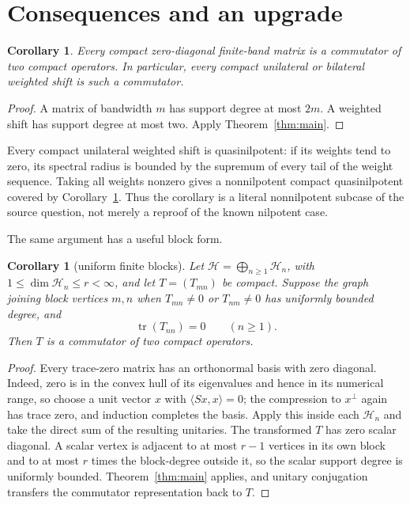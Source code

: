 \documentclass[11pt]{article}
\newtheorem{corollary}[theorem]{Corollary}
\newcommand{\Hc}{\mathcal H}
\begin{document}
\section*{Consequences and an upgrade}

\begin{corollary}\label{cor:band}
Every compact zero-diagonal finite-band matrix is a commutator of two compact
operators.  In particular, every compact unilateral or bilateral weighted
shift is such a commutator.
\end{corollary}

\begin{proof}
A matrix of bandwidth $m$ has support degree at most $2m$.  A weighted shift
has support degree at most two.  Apply Theorem~\ref{thm:main}.
\end{proof}

Every compact unilateral weighted shift is quasinilpotent: if its weights
tend to zero, its spectral radius is bounded by the supremum of every tail of
the weight sequence.  Taking all weights nonzero gives a nonnilpotent compact
quasinilpotent covered by Corollary~\ref{cor:band}.  Thus the corollary is a
literal nonnilpotent subcase of the source question, not merely a reproof of
the known nilpotent case.

The same argument has a useful block form.

\begin{corollary}[uniform finite blocks]\label{cor:block}
Let $\Hc=\bigoplus_{n\ge1}\Hc_n$, with $1\le\dim\Hc_n\le r<\infty$, and let
$T=(T_{mn})$ be compact.  Suppose the graph joining block vertices $m,n$ when
$T_{mn}\ne0$ or $T_{nm}\ne0$ has uniformly bounded degree, and
\[
 \operatorname{tr}(T_{nn})=0\qquad(n\ge1).
\]
Then $T$ is a commutator of two compact operators.
\end{corollary}

\begin{proof}
Every trace-zero matrix has an orthonormal basis with zero diagonal.  Indeed,
zero is in the convex hull of its eigenvalues and hence in its numerical
range, so choose a unit vector $x$ with $\langle Sx,x\rangle=0$; the
compression to $x^\perp$ again has trace zero, and induction completes the
basis.  Apply this inside each $\Hc_n$ and take the direct sum of the resulting
unitaries.  The transformed $T$ has zero scalar diagonal.  A scalar vertex is
adjacent to at most $r-1$ vertices in its own block and to at most $r$ times
the block-degree outside it, so the scalar support degree is uniformly
bounded.  Theorem~\ref{thm:main} applies, and unitary conjugation transfers
the commutator representation back to $T$.
\end{proof}
\end{document}
